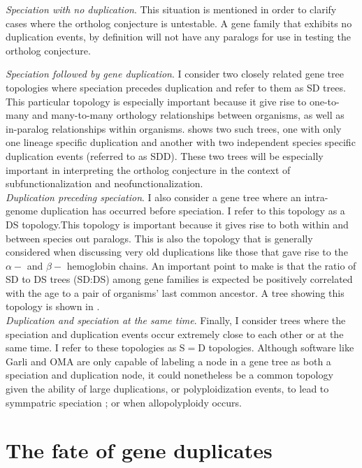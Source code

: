 \emph{Speciation with no duplication}. This situation is mentioned in order to clarify cases where the ortholog conjecture is untestable.  A  gene family that exhibits no duplication events, by definition will not have any paralogs for use in testing the ortholog conjecture.


\emph{Speciation followed by gene duplication}. I consider two closely related gene tree topologies where speciation precedes duplication and refer to them as SD trees.  This particular topology is especially important because it give rise to one-to-many and many-to-many orthology relationships between organisms, as well as in-paralog relationships within organisms.  \Cref{} shows two such trees, one with only one lineage specific duplication and another with two independent species specific duplication events (referred to as SDD).  These two trees will be especially important in interpreting the ortholog conjecture in the context of subfunctionalization and neofunctionalization.\\[2cm]

\emph{Duplication preceding speciation}. I also consider a gene tree where an intra-genome duplication has occurred before speciation.  I refer to this topology as a DS topology.This topology is important because it gives rise to both within and between species out paralogs.  This is also the topology that is generally considered when discussing very old duplications like those that gave rise to the $\alpha -$ and $\beta -$ hemoglobin chains.  An important point to make is that the ratio of SD to DS trees (SD:DS) among gene families is expected be positively correlated with the age to a pair of organisms' last common ancestor.  A tree showing this topology is shown in .  \\

\emph{Duplication and speciation at the same time}.  Finally, I consider trees where the speciation and duplication events occur extremely close to each other or at the same time.  I refer to these topologies as S$=$D topologies.  Although software like Garli \citep{po} and OMA \citep{po} are only capable of labeling a node in a gene tree as both a speciation and duplication node, it could nonetheless be a common topology given the ability of large duplications, or polyploidization events, to lead to symmpatric speciation \citep{po}; or when allopolyploidy occurs.  

\section{The fate of gene duplicates}

